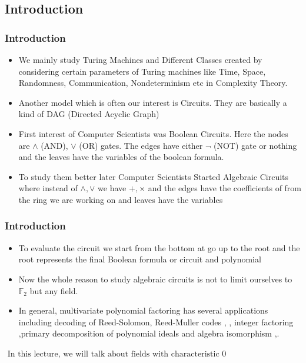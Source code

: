 \documentclass[10pt]{beamer}
\begin{document}

\subsection{Introduction}

\begin{frame}
	\frametitle{Introduction}
	
	\begin{itemize}
	    \item We mainly study Turing Machines and Different Classes created by considering certain parameters of Turing machines like Time, Space, Randomness, Communication, Nondeterminism etc in Complexity Theory.
     \item Another model which is often our interest is Circuits. They are basically a kind of DAG (Directed Acyclic Graph) 
     \item First interest of Computer Scientists was Boolean Circuits. Here the nodes are $\wedge$ (AND), $\vee$ (OR) gates. The edges have either $\neg$ (NOT) gate or nothing and the leaves have the variables of the boolean formula.
     \item To study them better later Computer Scientists Started Algebraic Circuits where instead of $\wedge, \vee $ we have $+,\times $ and the edges have the coefficients of from the ring we are working on and leaves have the variables
	\end{itemize}
\end{frame}

\begin{frame}
	\frametitle{Introduction}
	
	\begin{itemize}
	    
     \item To evaluate the circuit we start from the bottom at go up to the root and the root represents the final Boolean formula or circuit and polynomial
     \item Now the whole reason to study algebraic circuits is not to limit ourselves to $\mathbb{F}_2$ but any field.
     \item In general, multivariate polynomial factoring has several applications including decoding of Reed-Solomon, Reed-Muller codes \cite{reedsol}, \cite{sudreedsol}, integer factoring \cite{numsieve},primary decomposition of polynomial ideals \cite{grobnerbaspolyideL} and algebra isomorphism \cite{Kayal2006ComplexityOR},\cite{grhfactpoly}.
	\end{itemize}
\vspace*{5mm}

\begin{center}
    $\boxed{\text{ In this lecture, we will talk about fields with characteristic 0}}$
\end{center}
\end{frame}
\end{document}
